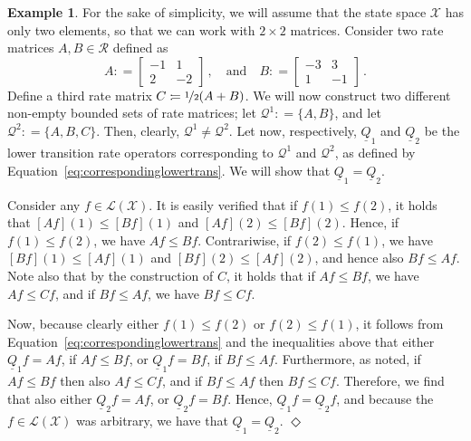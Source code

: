 \documentclass[10pt]{paper}
\theoremstyle{definition}
\newtheorem{exmp}{Example}%
\newcommand{\states}{\mathcal{X}}
\newcommand{\gambles}{\mathcal{L}}
\newcommand{\gamblesX}{\gambles(\states)}
\newcommand{\rateset}{\mathcal{Q}}
\newcommand{\lrate}{\underline{Q}}
\newcommand{\coloneqq}{:\!=}
\newcommand{\exampleend}{\hfill$\Diamond$}
\begin{document}
\begin{exmp}\label{example:different_sets_same_lower_rate}
For the sake of simplicity, we will assume that the state space $\states$ has only two elements, so that we can work with $2\times 2$ matrices. Consider two rate matrices $A,B\in\mathcal{R}$ defined as
\begin{equation*}
A\coloneqq\left[\begin{array}{rr}-1 & 1 \\2 & -2\end{array}\right]\,,\quad\text{and}\quad
B\coloneqq\left[\begin{array}{rr}-3 & 3 \\1 & -1\end{array}\right]\,.
\end{equation*}
Define a third rate matrix $C\coloneqq \nicefrac{1}{2}(A+B)$. We will now construct two different non-empty bounded sets of rate matrices; let $\rateset^1\coloneqq\{A,B\}$, and let $\rateset^2\coloneqq\{A,B,C\}$. Then, clearly, $\rateset^1\neq\rateset^2$. 
Let now, respectively, $\lrate_1$ and $\lrate_2$ be the lower transition rate operators corresponding to $\rateset^1$ and $\rateset^2$, as defined by Equation~\eqref{eq:correspondinglowertrans}. We will show that $\lrate_1=\lrate_2$.

Consider any $f\in\gamblesX$. It is easily verified that if $f(1)\leq f(2)$, it holds that $[Af](1)\leq[Bf](1)$ and $[Af](2)\leq[Bf](2)$. Hence, if $f(1)\leq f(2)$, we have $Af\leq Bf$. Contrariwise, if $f(2)\leq f(1)$, we have $[Bf](1)\leq [Af](1)$ and $[Bf](2)\leq[Af](2)$, and hence also $Bf\leq Af$. Note also that by the construction of $C$, it holds that if $Af\leq Bf$, we have $Af\leq Cf$, and if $Bf\leq Af$, we have $Bf\leq Cf$.

Now, because clearly either $f(1)\leq f(2)$ or $f(2)\leq f(1)$, it follows from Equation~\eqref{eq:correspondinglowertrans} and the inequalities above that either $\lrate_1f=Af$, if $Af\leq Bf$, or $\lrate_1f=Bf$, if $Bf\leq Af$. Furthermore, as noted, if $Af\leq Bf$ then also $Af\leq Cf$, and if $Bf\leq Af$ then $Bf\leq Cf$. Therefore, we find that also either $\lrate_2f=Af$, or $\lrate_2f=Bf$. Hence, $\lrate_1f=\lrate_2f$, and because the $f\in\gamblesX$ was arbitrary, we have that $\lrate_1=\lrate_2$.
\exampleend
\end{exmp}
\end{document}
